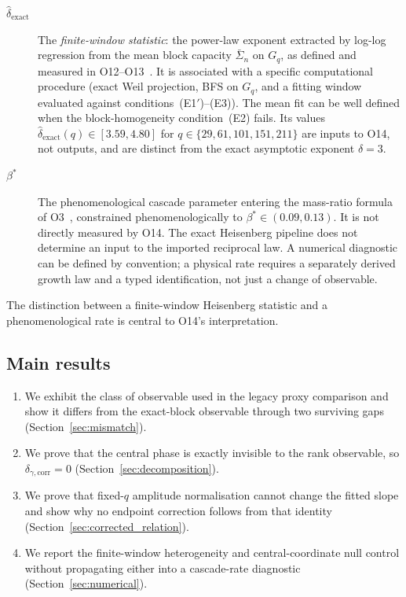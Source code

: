 \documentclass[11pt]{article}
\begin{document}
    \begin{description}
      \item[$\hat{\delta}_{\mathrm{exact}}$]
      The \emph{finite-window statistic}: the power-law exponent extracted by log-log regression
      from the mean block capacity $\bar{\Sigma}_n$ on $G_q$, as defined and measured in
      O12--O13~\cite{Beau2026a16,Beau2026a17}.
      It is associated with a specific computational procedure (exact Weil projection, BFS on
      $G_q$, and a fitting window evaluated against conditions~(E1$'$)--(E3)).
      The mean fit can be well defined when the block-homogeneity condition~(E2) fails.
      Its values $\hat{\delta}_{\mathrm{exact}}(q) \in [3.59, 4.80]$ for
      $q \in \{29,61,101,151,211\}$ are inputs to O14, not outputs, and are distinct from the
      exact asymptotic exponent $\delta=3$.

      \item[$\beta^{*}$]
      The phenomenological cascade parameter entering the mass-ratio
      formula of O3~\cite{Beau2026a7}, constrained phenomenologically to
      $\beta^{*} \in (0.09, 0.13)$.
      It is not directly measured by O14.
      The exact Heisenberg pipeline does not determine an input to the imported reciprocal law.
      A numerical diagnostic can be defined by convention; a physical rate requires a separately
      derived growth law and a typed identification, not just a change of observable.
    \end{description}

    The distinction between a finite-window Heisenberg statistic and a phenomenological rate is
    central to O14's interpretation.

  \subsection{Main results}
    \label{sec:results_summary}

    \begin{enumerate}
      \item We exhibit the class of observable used in the legacy proxy comparison and show it
      differs from the exact-block observable through two surviving gaps
      (Section~\ref{sec:mismatch}).
      \item We prove that the central phase is exactly invisible to the rank observable, so
      $\delta_{\gamma,\mathrm{corr}}=0$
      (Section~\ref{sec:decomposition}).
      \item We prove that fixed-$q$ amplitude normalisation cannot change the fitted slope and show
      why no endpoint correction follows from that identity
      (Section~\ref{sec:corrected_relation}).
      \item We report the finite-window heterogeneity and central-coordinate null control without
      propagating either into a cascade-rate diagnostic
      (Section~\ref{sec:numerical}).
    \end{enumerate}
\end{document}
